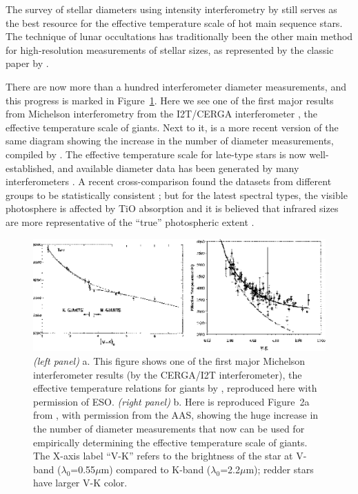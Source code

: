 \documentclass[12pt]{article}
\begin{document}
The survey of stellar diameters using intensity interferometry by
\citet{nii1974} still serves as the best resource for the
effective temperature scale of hot main sequence stars.  The technique
of lunar occultations has traditionally been the other main method
for high-resolution measurements of stellar sizes, as represented by
the classic paper by \citet{ridgway1980}.

There are now more than a hundred interferometer diameter
measurements, and this progress is marked in Figure~\ref{tempscales}.
Here we see one of the first major results from Michelson
interferometry from the I2T/CERGA interferometer
\citep{benedetto1987}, the effective temperature scale of giants.
Next to it, is a more recent version of the same diagram showing the
increase in the number of diameter measurements, compiled by
\citet{vanbelle1999}.  The effective temperature scale for late-type
stars is now well-established, and available diameter data has been
generated by many interferometers
\citep[e.g.,][]{mozurk1991,dyck1996a,perrin1998,nordgren1999}.  A
recent cross-comparison found the datasets from different groups to be
statistically consistent \citep{nordgren2001a}; but for
the latest spectral types, the visible photosphere is affected by TiO
absorption and it is believed that infrared sizes are more
representative of the ``true'' photospheric extent
\citep[e.g.,][]{dyck2002}.

\begin{figure}[tbhp]
\begin{center}
\includegraphics[clip,angle=0,width=5in]{Figures/JDM_tempscales.eps}
\caption{\footnotesize {\em (left panel)}
  a. This figure shows one of the first major Michelson interferometer
  results (by the CERGA/I2T interferometer), the effective temperature
  relations for giants by \citet[][see their Figure~1]{benedetto1987},
  reproduced here with permission of ESO.  {\em (right panel)} b. Here
  is reproduced Figure~2a from \citet{vanbelle1999}, with permission
  from the AAS, showing the huge increase in the number of diameter
  measurements that now can be used for empirically determining the
  effective temperature scale of giants.  The X-axis label ``V-K''
  refers to the brightness of the star at V-band ($\lambda_0$=0.55$\mu$m)
  compared to K-band ($\lambda_0$=2.2$\mu$m); redder stars have larger
  V-K color.
  \label{tempscales}}
\end{center}
\end{figure}
\end{document}
